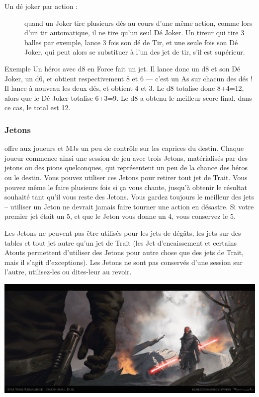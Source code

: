\begin{description}
\item[Un dé joker par action :] quand un Joker tire plusieurs dés au cours d’une même action, comme lors d’un tir automatique, il ne tire qu’un seul Dé Joker. Un tireur qui tire 3 balles par exemple, lance 3 fois son dé de Tir, et une seule fois son Dé Joker, qui peut alors se substituer à l’un des jet de tir, s’il est supérieur.
\end{description}

\begin{commentbox}{Exemple}
Un héros avec d8 en Force fait un jet. Il lance donc un d8 et son Dé Joker, un d6, et obtient respectivement 8 et 6 — c’est un As sur chacun des dés ! Il lance à nouveau les deux dés, et obtient 4 et 3. Le d8 totalise donc 8+4=12, alors que le Dé Joker totalise 6+3=9. Le d8 a obtenu le meilleur score final, dans ce cas, le total est 12.
\end{commentbox}

\subsubsection{Jetons}
\swfe offre aux joueurs et MJs un peu de contrôle sur les caprices du destin. Chaque joueur commence ainsi une session de jeu avec trois Jetons, matérialisés par des jetons ou des pions quelconques, qui représentent un peu de la chance des héros ou le destin. Vous pouvez utiliser ces Jetons pour retirer tout jet de Trait. Vous pouvez même le faire plusieurs fois si ça vous chante, jusqu’à obtenir le résultat souhaité tant qu’il vous reste des Jetons. Vous gardez toujours le meilleur des jets – utiliser un Jeton ne devrait jamais faire tourner une action en désastre. Si votre premier jet était un 5, et que le Jeton vous donne un 4, vous conservez le 5.

Les Jetons ne peuvent pas être utilisés pour les jets de dégâts, les jets sur des tables et tout jet autre qu’un jet de Trait (les Jet d’encaissement et certains Atouts permettent d’utiliser des Jetons pour autre chose que des jets de Trait, mais il s’agit d’exceptions). Les Jetons ne sont pas conservés d’une session sur l’autre, utilisez-les ou dites-leur au revoir.

\vspace*{\fill}
\hspace*{-0.5\columnsep}
\includegraphics[width=\textwidth]{img/regles/starwars_redesign.png}
\vspace*{\fill}

